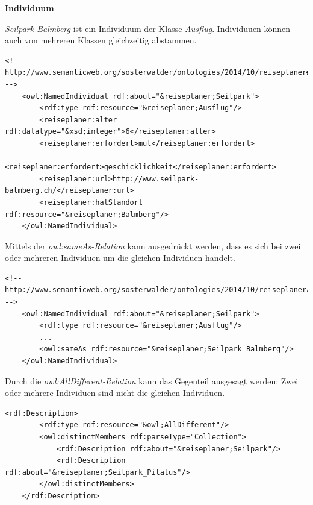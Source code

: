 \textbf{Individuum}

\textit{Seilpark Balmberg} ist ein Individuum der Klasse \textit{Ausflug}. Individuuen können auch von mehreren Klassen gleichzeitig abstammen.

\begin{lstlisting}[caption={Beispiel eines Individuums}]
    <!-- http://www.semanticweb.org/sosterwalder/ontologies/2014/10/reiseplaner#Seilpark -->
    <owl:NamedIndividual rdf:about="&reiseplaner;Seilpark">
        <rdf:type rdf:resource="&reiseplaner;Ausflug"/>
        <reiseplaner:alter rdf:datatype="&xsd;integer">6</reiseplaner:alter>
        <reiseplaner:erfordert>mut</reiseplaner:erfordert>
        <reiseplaner:erfordert>geschicklichkeit</reiseplaner:erfordert>
        <reiseplaner:url>http://www.seilpark-balmberg.ch/</reiseplaner:url>
        <reiseplaner:hatStandort rdf:resource="&reiseplaner;Balmberg"/>
    </owl:NamedIndividual>
\end{lstlisting}

\newpage

Mittels der \textit{owl:sameAs-Relation} kann ausgedrückt werden, dass es sich bei zwei oder mehreren Individuen um die gleichen Individuen handelt.

\begin{lstlisting}[caption={Beispiel einer Gleichstellung von Individuen: Seilpark und Seilpark-Balmberg sind das gleiche Individuum}]
    <!-- http://www.semanticweb.org/sosterwalder/ontologies/2014/10/reiseplaner#Seilpark -->
    <owl:NamedIndividual rdf:about="&reiseplaner;Seilpark">
        <rdf:type rdf:resource="&reiseplaner;Ausflug"/>
        ...
        <owl:sameAs rdf:resource="&reiseplaner;Seilpark_Balmberg"/>
    </owl:NamedIndividual>
\end{lstlisting}


Durch die \textit{owl:AllDifferent-Relation} kann das Gegenteil ausgesagt werden:  Zwei oder mehrere Individuen sind nicht die gleichen Individuen.

\begin{lstlisting}[caption={Beispiel einer Differenzierung von Individuen: Seilpark ist nicht das gleiche Individuum wie Seilpark-Pilatus}]
    <rdf:Description>
        <rdf:type rdf:resource="&owl;AllDifferent"/>
        <owl:distinctMembers rdf:parseType="Collection">
            <rdf:Description rdf:about="&reiseplaner;Seilpark"/>
            <rdf:Description rdf:about="&reiseplaner;Seilpark_Pilatus"/>
        </owl:distinctMembers>
    </rdf:Description>

\end{lstlisting}

